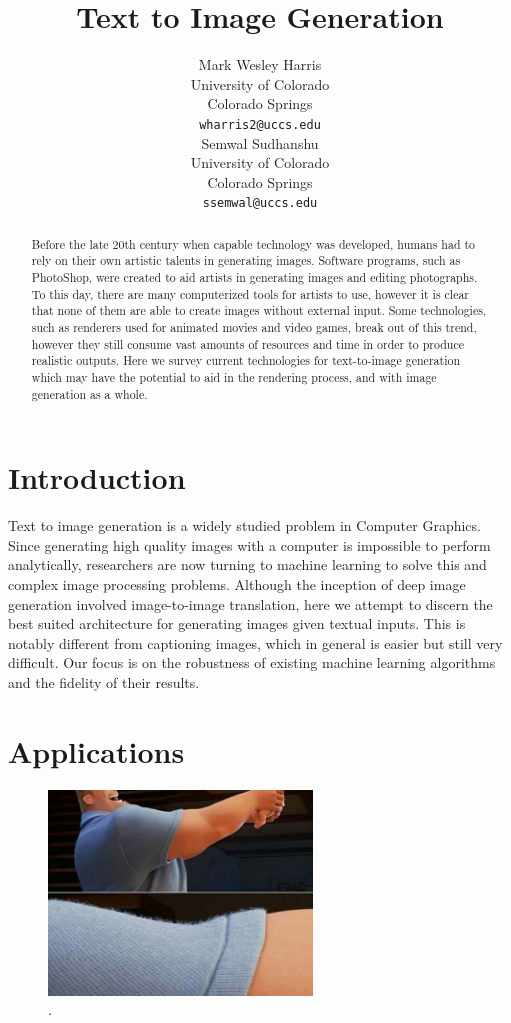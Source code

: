 \documentclass[letterpaper]{article} %
\title{Text to Image Generation}
\author{Mark Wesley Harris\\
University of Colorado\\
Colorado Springs\\
\texttt{wharris2@uccs.edu}\\
\And
Semwal Sudhanshu\\
University of Colorado\\
Colorado Springs\\
\texttt{ssemwal@uccs.edu} \\
}
\begin{document}
\maketitle

\begin{abstract}
Before the late 20th century when capable technology was developed, humans had 
to rely on their own artistic talents in generating images.
Software programs, such as PhotoShop, were created to aid artists in generating 
images and editing photographs.
To this day, there are many computerized tools for artists to use, however it 
is clear that none of them are able to create images without external input. 
Some technologies, such as renderers used for animated movies and video games, 
break out of this trend, however they still consume vast amounts of resources 
and time in order to produce realistic outputs. Here we survey current 
technologies for text-to-image generation which may have the potential to aid 
in the rendering process, and with image generation as a whole.
\end{abstract}

\section{Introduction}
\label{sec:introduction}
Text to image generation is a widely studied problem in Computer Graphics. 
Since generating high quality images with a computer is impossible 
to perform analytically, researchers are now turning to machine learning to 
solve this and complex image processing problems.
Although the inception of deep image generation involved image-to-image 
translation, here we attempt to discern the best suited architecture for 
generating images given textual inputs. This is notably different from 
captioning images, which in general is easier but still very difficult. Our 
focus is on the robustness of existing machine learning algorithms and the 
fidelity of their results.

\section{Applications}
\begin{figure}[htbp]
\centerline{\includegraphics[width=7cm]{incredibles.png}}
\caption{.}
\label{fig:incredibles}
\end{figure}
\end{document}
